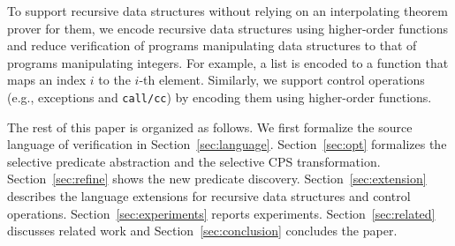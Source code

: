 \begin{enumerate}
      To support recursive data structures without relying on
      an interpolating theorem prover for them,
      we encode recursive data structures using higher-order functions
   and reduce verification of programs manipulating data structures
   to that of programs manipulating integers.  For example, a list is
      encoded to a function that maps an index $i$ to the $i$-th
      element.  Similarly, we support control operations (e.g.,
      exceptions and \texttt{call/cc}) by encoding them
    using higher-order functions.
\end{enumerate}
\vspace{-5pt}


The rest of this paper is organized as follows.
We first formalize the source language of verification in
Section~\ref{sec:language}.  Section~\ref{sec:opt} formalizes the
selective predicate abstraction and the selective CPS transformation.
Section~\ref{sec:refine} shows the new predicate discovery.
Section~\ref{sec:extension} describes the language extensions for recursive
data structures and control operations.  Section~\ref{sec:experiments}
reports experiments.  Section~\ref{sec:related} discusses related work
and Section~\ref{sec:conclusion} concludes the paper.














